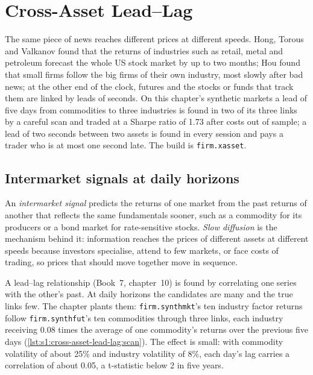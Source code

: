 \chapter{Cross-Asset Lead--Lag}\label{ch:s1:cross-asset-lead-lag}

The same piece of news reaches different prices at different speeds. Hong, Torous and Valkanov found that the returns of industries such as retail,
metal and petroleum forecast the whole US stock market by up to two months; Hou found that small firms follow the big firms of their own industry, most
slowly after bad news; at the other end of the clock, futures and the stocks or funds that track them are linked by leads of seconds. On this chapter's
synthetic markets a lead of five days from commodities to three industries is found in two of its three links by a careful scan and traded at a Sharpe
ratio of 1.73 after costs out of sample; a lead of two seconds between two assets is found in every session and pays a trader who is at most one second
late. The build is \texttt{firm.xasset}.

\section{Intermarket signals at daily horizons}

\begin{definition}\label{def:s1:cross-asset-lead-lag:intermarket}
An \emph{intermarket signal} predicts the returns of one market from the past returns of another that reflects the same
fundamentals sooner, such as a commodity for its producers or a bond market for rate-sensitive stocks. \emph{Slow diffusion} is the
mechanism behind it: information reaches the prices of different assets at different speeds because investors specialise, attend to few markets, or
face costs of trading, so prices that should move together move in sequence.
\end{definition}

A lead--lag relationship (Book~7, chapter~10) is found by correlating one series with the other's past. At daily horizons the candidates are many and
the true links few. The chapter plants them: \texttt{firm.synthmkt}'s ten industry factor returns follow \texttt{firm.synthfut}'s ten commodities
through three links, each industry receiving 0.08 times the average of one commodity's returns over the previous five days
(\cref{lst:s1:cross-asset-lead-lag:scan}). The effect is small: with commodity volatility of about 25\% and industry volatility of 8\%, each day's lag
carries a correlation of about 0.05, a t-statistic below 2 in five years.

